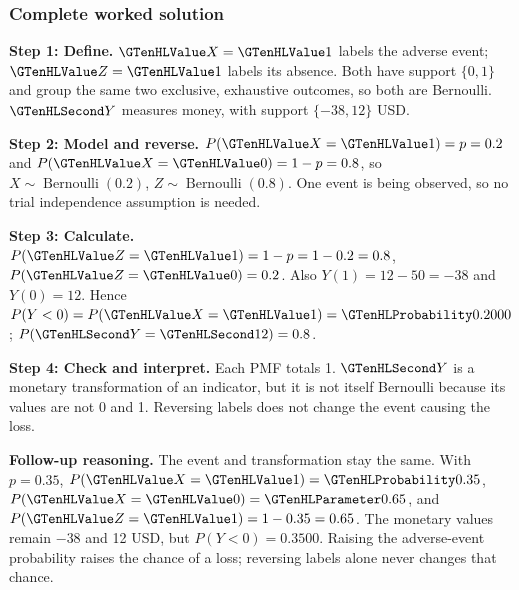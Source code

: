 \subsubsection*{Complete worked solution}\label{sol:c3-reverse}
\par\noindent\begin{minipage}{\linewidth}
\textbf{Step 1: Define.} $\Indicator{X}=\Indicator{1}$ labels the adverse event; $\Indicator{Z}=\Indicator{1}$ labels its absence. Both have support $\{0,1\}$ and group the same two exclusive, exhaustive outcomes, so both are Bernoulli. $\Money{Y}$ measures money, with support $\{-38,12\}$ USD.
\end{minipage}\par\medskip
\par\noindent\begin{minipage}{\linewidth}
\textbf{Step 2: Model and reverse.} $P(\Indicator{X}=\Indicator{1})=p=0.2$ and $P(\Indicator{X}=\Indicator{0})=1-p=0.8$, so $X\sim\operatorname{Bernoulli}(0.2)$, $Z\sim\operatorname{Bernoulli}(0.8)$. One event is being observed, so no trial independence assumption is needed.
\end{minipage}\par\medskip
\par\noindent\begin{minipage}{\linewidth}
\textbf{Step 3: Calculate.} $P(\Indicator{Z}=\Indicator{1})=1-p=1-0.2=0.8$, $P(\Indicator{Z}=\Indicator{0})=0.2$. Also $Y(1)=12-50=-38$ and $Y(0)=12$. Hence $P(Y<0)=P(\Indicator{X}=\Indicator{1})=\SuccessProb{0.2000}$; $P(\Money{Y}=\Money{12})=0.8$.
\end{minipage}\par\medskip
\par\noindent\begin{minipage}{\linewidth}
\textbf{Step 4: Check and interpret.} Each PMF totals 1. $\Money{Y}$ is a monetary transformation of an indicator, but it is not itself Bernoulli because its values are not 0 and 1. Reversing labels does not change the event causing the loss.
\end{minipage}\par\medskip

\textbf{Follow-up reasoning.} The event and transformation stay the same. With $p=0.35$, $P(\Indicator{X}=\Indicator{1})=\SuccessProb{0.35}$, $P(\Indicator{X}=\Indicator{0})=\FailureProb{0.65}$, and $P(\Indicator{Z}=\Indicator{1})=1-0.35=0.65$. The monetary values remain $-38$ and 12 USD, but $P(Y<0)=0.3500$. Raising the adverse-event probability raises the chance of a loss; reversing labels alone never changes that chance.

